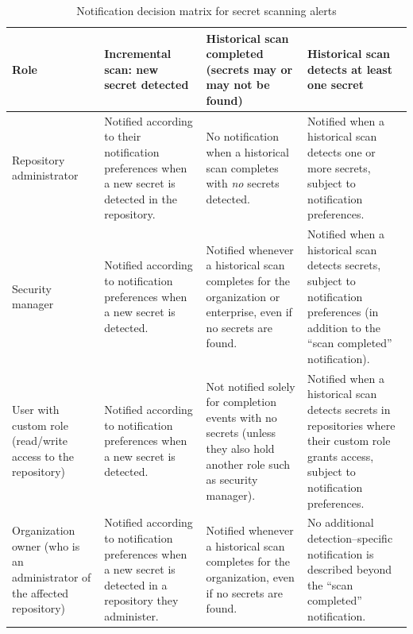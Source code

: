 \documentclass{article}
\begin{document}
\begin{table}[htbp]
  \centering
  \small
  \captionsetup{justification=raggedright,singlelinecheck=false}
  \caption{Notification decision matrix for secret scanning alerts}
  \label{tab:decision-matrix}
  \begin{tabular}{
      >{\raggedright\arraybackslash}p{}
      >{\raggedright\arraybackslash}p{}
      >{\raggedright\arraybackslash}p{}
      >{\raggedright\arraybackslash}p{}
    }
    \toprule
    \textbf{Role} &
    \textbf{Incremental scan: new secret detected} &
    \textbf{Historical scan completed (secrets may or may not be found)} &
    \textbf{Historical scan detects at least one secret} \\
    \midrule
    Repository administrator &
      Notified according to their notification preferences when a new secret is detected in the repository. &
      No notification when a historical scan completes with \emph{no} secrets detected. &
      Notified when a historical scan detects one or more secrets, subject to notification preferences. \\[0.75em]

    Security manager &
      Notified according to notification preferences when a new secret is detected. &
      Notified whenever a historical scan completes for the organization or enterprise, even if no secrets are found. &
      Notified when a historical scan detects secrets, subject to notification preferences (in addition to the ``scan completed'' notification). \\[0.75em]

    User with custom role (read/write access to the repository) &
      Notified according to notification preferences when a new secret is detected. &
      Not notified solely for completion events with no secrets (unless they also hold another role such as security manager). &
      Notified when a historical scan detects secrets in repositories where their custom role grants access, subject to notification preferences. \\[0.75em]

    Organization owner (who is an administrator of the affected repository) &
      Notified according to notification preferences when a new secret is detected in a repository they administer. &
      Notified whenever a historical scan completes for the organization, even if no secrets are found. &
      No additional detection--specific notification is described beyond the ``scan completed'' notification. \\[0.75em]


\end{tabular}
\end{table}
\end{document}

